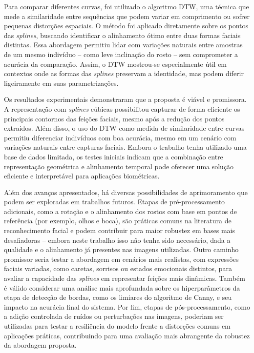 Para comparar diferentes curvas, foi utilizado o algoritmo DTW, uma técnica que mede a similaridade entre sequências que podem variar em comprimento ou sofrer pequenas distorções espaciais. O método foi aplicado diretamente sobre os pontos das \textit{splines}, buscando identificar o alinhamento ótimo entre duas formas faciais distintas. Essa abordagem permitiu lidar com variações naturais entre amostras de um mesmo indivíduo -- como leve inclinação do rosto -- sem comprometer a acurácia da comparação. Assim, o DTW mostrou-se especialmente útil em contextos onde as formas das \textit{splines} preservam a identidade, mas podem diferir ligeiramente em suas parametrizações.


Os resultados experimentais demonstraram que a proposta é viável e promissora. A representação com \textit{splines} cúbicas possibilitou capturar de forma eficiente os principais contornos das feições faciais, mesmo após a redução dos pontos extraídos. Além disso, o uso do DTW como medida de similaridade entre curvas permitiu diferenciar indivíduos com boa acurácia, mesmo em um cenário com variações naturais entre capturas faciais. Embora o trabalho tenha utilizado uma base de dados limitada, os testes iniciais indicam que a combinação entre representação geométrica e alinhamento temporal pode oferecer uma solução eficiente e interpretável para aplicações biométricas.

Além dos avanços apresentados, há diversas possibilidades de aprimoramento que podem ser exploradas em trabalhos futuros. Etapas de pré-processamento adicionais, como a rotação e o alinhamento dos rostos com base em pontos de referência (por exemplo, olhos e boca), são práticas comuns na literatura de reconhecimento facial e podem contribuir para maior robustez em bases mais desafiadoras -- embora neste trabalho isso não tenha sido necessário, dada a qualidade e o alinhamento já presentes nas imagens utilizadas. Outro caminho promissor seria testar a abordagem em cenários mais realistas, com expressões faciais variadas, como caretas, sorrisos ou estados emocionais distintos, para avaliar a capacidade das \textit{splines} em representar feições mais dinâmicas. Também é válido considerar uma análise mais aprofundada sobre os hiperparâmetros da etapa de detecção de bordas, como os limiares do algoritmo de Canny, e seu impacto na acurácia final do sistema. Por fim, etapas de pós-processamento, como a adição controlada de ruídos ou perturbações nas imagens, poderiam ser utilizadas para testar a resiliência do modelo frente a distorções comuns em aplicações práticas, contribuindo para uma avaliação mais abrangente da robustez da abordagem proposta.